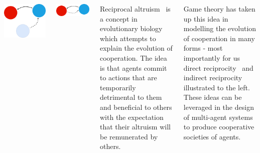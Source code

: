 \documentclass[25pt,a3paper]{tikzposter}
\begin{document}
\begin{columns}
{\begin{minipage}{12cm}
			\includegraphics[width=\textwidth]{IndirectRec.png}
	\end{minipage}
	\begin{minipage}{12cm}
		\includegraphics[width=\textwidth]{DirectRec.png}
	\end{minipage}
	\begin{minipage}{12cm}
		Reciprocal altruism~\parencite{trivers1971evolution} is a concept in evolutionary biology which attempts to explain the evolution of cooperation. The idea is that agents commit to actions that are temporarily detrimental to them and beneficial to others with the expectation that their altruism will be remunerated by others.\\
	\end{minipage}
		Game theory has taken up this idea in modelling the evolution of cooperation in many forms - most importantly for us direct reciprocity~\parencite{evolution_of_cooperation} and indirect reciprocity~\parencite{evol_indirect_image} illustrated to the left. These ideas can be leveraged in the design of multi-agent systems to produce cooperative societies of agents.
}
\end{columns}
\end{document}
